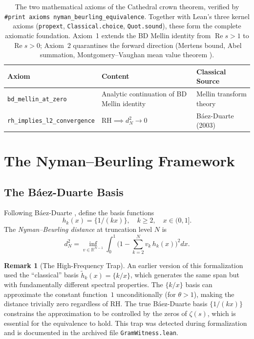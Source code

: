\documentclass[11pt,a4paper]{article}
\theoremstyle{definition}
\newtheorem{remark}[definition]{Remark}
\newcommand{\RH}{\mathrm{RH}}
\newcommand{\re}{\operatorname{Re}}
\newcommand{\RR}{\mathbb{R}}
\newcommand{\fract}[1]{\{#1\}}
\newcommand{\lean}[1]{\texttt{#1}}
\begin{document}
\begin{table}[h]
\centering
\begin{tabular}{@{}lll@{}}
\toprule
\textbf{Axiom} & \textbf{Content} & \textbf{Classical Source} \\
\midrule
\lean{bd\_mellin\_at\_zero} & Analytic continuation of BD Mellin identity & Mellin transform theory \\
\lean{rh\_implies\_l2\_convergence} & $\RH \implies d_N^2 \to 0$ & B\'aez-Duarte (2003) \\
\bottomrule
\end{tabular}
\caption{The two mathematical axioms of the Cathedral crown theorem, verified by
\lean{\#print axioms nyman\_beurling\_equivalence}. Together with
Lean's three kernel axioms (\lean{propext}, \lean{Classical.choice},
\lean{Quot.sound}), these form the complete axiomatic foundation.
Axiom~1 extends the BD Mellin identity from $\re s > 1$ to $\re s > 0$;
Axiom~2 quarantines the forward direction (Mertens bound, Abel summation,
Montgomery--Vaughan mean value theorem \cite{montgomery1973}).}
\label{tab:axioms}
\end{table}

\section{The Nyman--Beurling Framework}

\subsection{The B\'aez-Duarte Basis}

Following B\'aez-Duarte \cite{baezduarte2003}, define the basis functions
\[
  h_k(x) = \fract{1/(kx)}, \quad k \geq 2, \quad x \in (0,1].
\]
The \emph{Nyman--Beurling distance} at truncation level $N$ is
\[
  d_N^2 = \inf_{v \in \RR^{N-1}} \int_0^1
    \biggl(1 - \sum_{k=2}^{N} v_k\,h_k(x)\biggr)^2 dx.
\]

\begin{remark}[The High-Frequency Trap]
\label{rem:hf-trap}
An earlier version of this formalization used the ``classical'' basis
$\tilde{h}_k(x) = \{k/x\}$, which generates the same span but with
fundamentally different spectral properties. The $\{k/x\}$ basis can
approximate the constant function~$1$ unconditionally (for $\theta > 1$),
making the distance trivially zero regardless of RH. The true
B\'aez-Duarte basis $\{1/(kx)\}$ constrains the approximation to be
controlled by the zeros of $\zeta(s)$, which is essential for the
equivalence to hold. This trap was detected during formalization and
is documented in the archived file \lean{GramWitness.lean}.
\end{remark}
\end{document}
